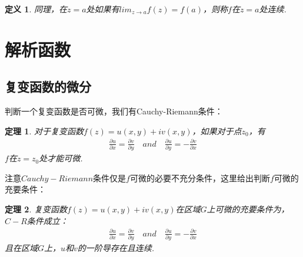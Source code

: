 \documentclass[12pt, a4paper]{ctexbook}
\newtheorem{definition}{定义}[chapter] %
\newtheorem{theorem}{定理}[chapter] %
\begin{document}
                \begin{definition}
                    \label{def:continuity_of_complex_function}
                    同理，在$z = a$处如果有$lim_{z \to a}f(z) = f(a)$，则称$f$在$z = a$处连续.
                \end{definition}


        \section{解析函数}

            \subsection{复变函数的微分}
                判断一个复变函数是否可微，我们有Cauchy-Riemann条件：
                \begin{theorem}
                    \label{the:Cauchy-Riemann_condition}
                    对于复变函数$f(z) = u(x,y) + iv(x,y)$，如果对于点$z_0$，有
                    \begin{align}
                        \frac{\partial u}{\partial x} = \frac{\partial v}{\partial y} \quad and \quad \frac{\partial u}{\partial y} = -\frac{\partial v}{\partial x}
                    \end{align}
                    $f$在$z = z_0$处才能可微.
                \end{theorem}

                注意$Cauchy-Riemann$条件仅是$f$可微的必要不充分条件，这里给出判断$f$可微的充要条件：
                \begin{theorem}
                    \label{the:differentiability_of_complex_function}
                    复变函数$f(z) = u(x, y) + iv(x, y)$在区域$G$上可微的充要条件为，$C-R$条件成立：
                    \begin{align*}
                        \frac{\partial u}{\partial x} = \frac{\partial v}{\partial y} \quad and \quad \frac{\partial u}{\partial y} = -\frac{\partial v}{\partial x}
                    \end{align*}
                    且在区域$G$上，$u$和$v$的一阶导存在且连续.
                \end{theorem}
\end{document}
